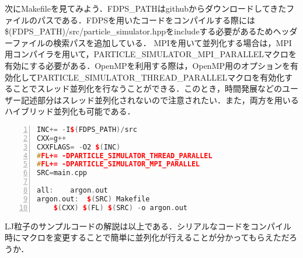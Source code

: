 \documentclass[twocolumn,10pt]{jarticle}
\begin{document}
次にMakefileを見てみよう．FDPS\_PATHはgithubからダウンロードしてきたファイルのパスである．FDPSを用いたコードをコンパイルする際には\$(FDPS\_PATH)/src/particle\_simulator.hppをincludeする必要があるためヘッダーファイルの検索パスを追加している．
MPIを用いて並列化する場合は，MPI用コンパイラを用いて，PARTICLE\_SIMULATOR\_MPI\_PARALLELマクロを有効にする必要がある．OpenMPを利用する際は，OpenMP用のオプションを有効化してPARTICLE\_SIMULATOR\_THREAD\_PARALLELマクロを有効化することでスレッド並列化を行なうことができる．このとき，時間発展などのユーザー記述部分はスレッド並列化されないので注意されたい．また，両方を用いるハイブリッド並列化も可能である．
\begin{lstlisting}[language=c++,numbers=left,numbersep=5pt,frame=single,basicstyle=\ttfamily]
INC+= -I$(FDPS_PATH)/src
CXX=g++
CXXFLAGS= -O2 $(INC)
#FL+= -DPARTICLE_SIMULATOR_THREAD_PARALLEL
#FL+= -DPARTICLE_SIMULATOR_MPI_PARALLEL
SRC=main.cpp

all:	argon.out
argon.out:	$(SRC) Makefile
	$(CXX) $(FL) $(SRC) -o argon.out
\end{lstlisting}

LJ粒子のサンプルコードの解説は以上である．シリアルなコードをコンパイル時にマクロを変更することで簡単に並列化が行えることが分かってもらえただろうか．

\end{document}
